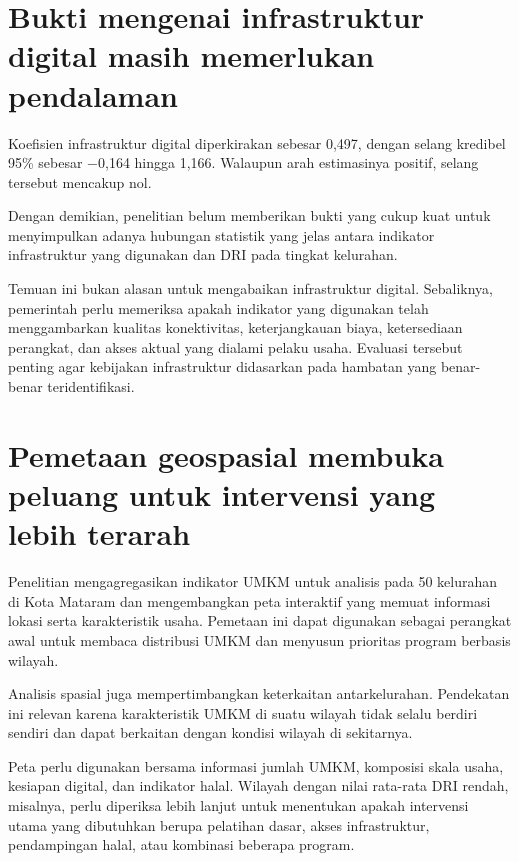 \documentclass[
  indonesian,
  11pt,
  a4paper,
]{report}
\begin{document}
\section*{Bukti mengenai infrastruktur digital masih memerlukan
pendalaman}\label{bukti-mengenai-infrastruktur-digital-masih-memerlukan-pendalaman}

Koefisien infrastruktur digital diperkirakan sebesar 0,497, dengan
selang kredibel 95\% sebesar −0,164 hingga 1,166. Walaupun arah
estimasinya positif, selang tersebut mencakup nol.

Dengan demikian, penelitian belum memberikan bukti yang cukup kuat untuk
menyimpulkan adanya hubungan statistik yang jelas antara indikator
infrastruktur yang digunakan dan DRI pada tingkat kelurahan.

Temuan ini bukan alasan untuk mengabaikan infrastruktur digital.
Sebaliknya, pemerintah perlu memeriksa apakah indikator yang digunakan
telah menggambarkan kualitas konektivitas, keterjangkauan biaya,
ketersediaan perangkat, dan akses aktual yang dialami pelaku usaha.
Evaluasi tersebut penting agar kebijakan infrastruktur didasarkan pada
hambatan yang benar-benar teridentifikasi.

\section*{Pemetaan geospasial membuka peluang untuk intervensi yang
lebih
terarah}\label{pemetaan-geospasial-membuka-peluang-untuk-intervensi-yang-lebih-terarah}

Penelitian mengagregasikan indikator UMKM untuk analisis pada 50
kelurahan di Kota Mataram dan mengembangkan peta interaktif yang memuat
informasi lokasi serta karakteristik usaha. Pemetaan ini dapat digunakan
sebagai perangkat awal untuk membaca distribusi UMKM dan menyusun
prioritas program berbasis wilayah.

Analisis spasial juga mempertimbangkan keterkaitan antarkelurahan.
Pendekatan ini relevan karena karakteristik UMKM di suatu wilayah tidak
selalu berdiri sendiri dan dapat berkaitan dengan kondisi wilayah di
sekitarnya.

Peta perlu digunakan bersama informasi jumlah UMKM, komposisi skala
usaha, kesiapan digital, dan indikator halal. Wilayah dengan nilai
rata-rata DRI rendah, misalnya, perlu diperiksa lebih lanjut untuk
menentukan apakah intervensi utama yang dibutuhkan berupa pelatihan
dasar, akses infrastruktur, pendampingan halal, atau kombinasi beberapa
program.
\end{document}

